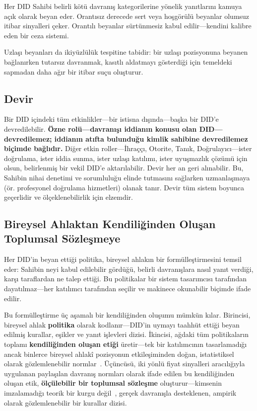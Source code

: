 \documentclass[11pt,a4paper,twocolumn]{article}
\begin{document}
Her DID Sahibi belirli kötü davranış kategorilerine yönelik yanıtlarını kamuya açık olarak beyan eder. Orantısız derecede sert veya hoşgörülü beyanlar olumsuz itibar sinyalleri çeker. Orantılı beyanlar sürtünmesiz kabul edilir---kendini kalibre eden bir ceza sistemi.

Uzlaşı beyanları da ikiyüzlülük tespitine tabidir: bir uzlaşı pozisyonuna beyanen bağlanırken tutarsız davranmak, kasıtlı aldatmayı gösterdiği için temeldeki sapmadan daha ağır bir itibar suçu oluşturur.

\subsection{Devir}

Bir DID içindeki tüm etkinlikler---bir istisna dışında---başka bir DID'e devredilebilir. \textbf{Özne rolü---davranışı iddianın konusu olan DID---devredilemez; iddianın atıfta bulunduğu kimlik sahibine devredilemez biçimde bağlıdır.} Diğer etkin roller---İhraççı, Otorite, Tanık, Doğrulayıcı---ister doğrulama, ister iddia sunma, ister uzlaşı katılımı, ister uyuşmazlık çözümü için olsun, belirlenmiş bir vekil DID'e aktarılabilir. Devir her an geri alınabilir. Bu, Sahibin nihai denetimi ve sorumluluğu elinde tutmasını sağlarken uzmanlaşmaya (ör. profesyonel doğrulama hizmetleri) olanak tanır. Devir tüm sistem boyunca geçerlidir ve ölçeklenebilirlik için elzemdir.

\subsection{Bireysel Ahlaktan Kendiliğinden Oluşan Toplumsal Sözleşmeye}

Her DID'in beyan ettiği politika, bireysel ahlakın bir formülleştirmesini temsil eder: Sahibin neyi kabul edilebilir gördüğü, belirli davranışlara nasıl yanıt verdiği, karşı taraflardan ne talep ettiği. Bu politikalar bir sistem tasarımcısı tarafından dayatılmaz---her katılımcı tarafından seçilir ve makinece okunabilir biçimde ifade edilir.

Bu formülleştirme üç aşamalı bir kendiliğinden oluşumu mümkün kılar. Birincisi, bireysel ahlak \textbf{politika} olarak kodlanır---DID'in uymayı taahhüt ettiği beyan edilmiş kurallar, eşikler ve yanıt işlevleri dizisi. İkincisi, ağdaki tüm politikaların toplamı \textbf{kendiliğinden oluşan etiği} üretir---tek bir katılımcının tasarlamadığı ancak binlerce bireysel ahlakî pozisyonun etkileşiminden doğan, istatistiksel olarak gözlemlenebilir normlar~\cite{durkheim1893}. Üçüncüsü, iki yönlü fiyat sinyalleri aracılığıyla uygulanan paylaşılan davranış normları olarak ifade edilen bu kendiliğinden oluşan etik, \textbf{ölçülebilir bir toplumsal sözleşme} oluşturur---kimsenin imzalamadığı teorik bir kurgu değil~\cite{rawls1971}, gerçek davranışla desteklenen, ampirik olarak gözlemlenebilir bir kurallar dizisi.
\end{document}
